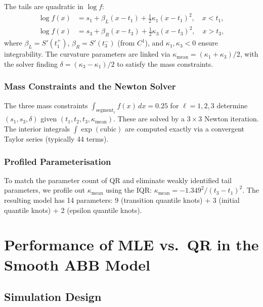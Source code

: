 \documentclass[12pt]{article}
\begin{document}
The tails are quadratic in $\log f$:
\begin{align}
\log f(x) &= s_1 + \beta_L(x - t_1) + \tfrac{1}{2}\kappa_1(x - t_1)^2,
  \quad x < t_1, \\
\log f(x) &= s_3 + \beta_R(x - t_3) + \tfrac{1}{2}\kappa_3(x - t_3)^2,
  \quad x > t_3,
\end{align}
where $\beta_L = S'(t_1^+)$, $\beta_R = S'(t_3^-)$ (from $C^1$),
and $\kappa_1, \kappa_3 < 0$ ensure integrability.
The curvature parameters are linked via $\kappa_{\text{mean}} = (\kappa_1 + \kappa_3)/2$,
with the solver finding $\delta = (\kappa_3 - \kappa_1)/2$ to satisfy
the mass constraints.

\subsubsection*{Mass Constraints and the Newton Solver}

The three mass constraints
$\int_{\text{segment}_\ell} f(x)\, dx = 0.25$ for $\ell = 1, 2, 3$
determine $(s_1, s_3, \delta)$ given $(t_1, t_2, t_3, \kappa_{\text{mean}})$.
These are solved by a $3 \times 3$ Newton iteration.
The interior integrals $\int \exp(\text{cubic})$ are computed exactly via a
convergent Taylor series (typically 44 terms).

\subsubsection*{Profiled Parameterisation}

To match the parameter count of QR and eliminate weakly identified tail
parameters, we profile out $\kappa_{\text{mean}}$ using the IQR:
$\kappa_{\text{mean}} = -1.349^2 / (t_3 - t_1)^2$.
The resulting model has 14 parameters:
9 (transition quantile knots) + 3 (initial quantile knots) + 2 (epsilon quantile knots).

\section{Performance of MLE vs.\ QR in the Smooth ABB Model}
\label{sec:mc_smooth}

\subsection{Simulation Design}
\end{document}

